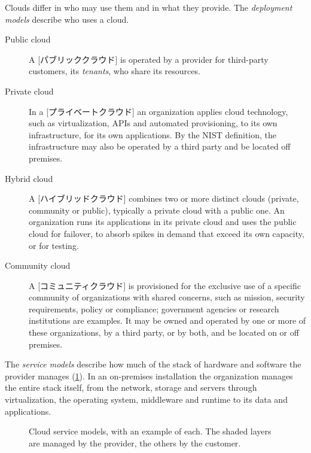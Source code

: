 \documentclass[../main.tex]{subfiles}
\begin{document}
Clouds differ in who may use them and in what they provide.  The \emph{deployment models}
describe who uses a cloud.
\begin{description}
  \item[Public cloud] A [パブリッククラウド] is operated by
    a provider for third-party customers, its \emph{tenants}, who share its
    resources.
  \item[Private cloud] In a [プライベートクラウド] an
    organization applies cloud technology, such as virtualization, APIs and
    automated provisioning, to its own infrastructure, for its own
    applications.  By the NIST definition, the infrastructure may also be
    operated by a third party and be located off premises.
  \item[Hybrid cloud] A [ハイブリッドクラウド] combines
    two or more distinct clouds (private, community or public), typically a
    private cloud with a public one.  An organization runs its applications
    in its private cloud and uses the public cloud for failover, to absorb
    spikes in demand that exceed its own capacity, or for testing.
  \item[Community cloud] A [コミュニティクラウド] is
    provisioned for the exclusive use of a specific community of
    organizations with shared concerns, such as mission, security
    requirements, policy or compliance; government agencies or research
    institutions are examples.  It may be owned and operated by one or more
    of these organizations, by a third party, or by both, and be located on
    or off premises.
\end{description}

The \emph{service models} describe how much of the stack of hardware and
software the provider manages (\cref{fig:l16-service-models}).  In an
on-premises installation the organization manages the entire stack itself,
from the network, storage and servers through virtualization, the operating
system, middleware and runtime to its data and applications.

\begin{figure}[htbp]
  \centering
  
  \caption{Cloud service models, with an example of each.  The shaded layers
    are managed by the provider, the others by the customer.}
  \label{fig:l16-service-models}
\end{figure}
\end{document}
